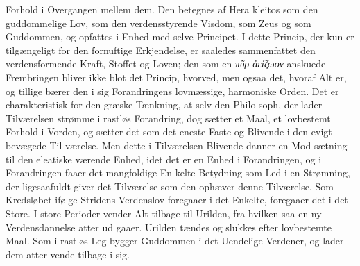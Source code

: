 \documentclass[12pt,a4paper]{book}
\newcommand{\gk}[1]{\textit{#1}}
\begin{document}
%
Forhold i Overgangen mellem dem. Den betegnes af Hera\-%
kleitos som den guddommelige Lov, som den verdensstyrende
Visdom, som Zeus og som Guddommen, og opfattes i Enhed
med selve Principet. I dette Princip, der kun er tilgængeligt
for den fornuftige Erkjendelse, er saaledes sammenfattet den
verdensformende Kraft, Stoffet og Loven; den som en \gk{πῦρ
ἀείζωον} anskuede Frembringen bliver ikke blot det Princip,
hvorved, men ogsaa det, hvoraf Alt er, og tillige bærer den i
sig Forandringens lovmæssige, harmoniske Orden. Det er
charakteristisk for den græske Tænkning, at selv den Philo\-%
soph, der lader Tilværelsen strømme i rastløs Forandring, dog
sætter et Maal, et lovbestemt Forhold i Vorden, og sætter det
som det eneste Faste og Blivende i den evigt bevægede Til\-%
værelse. Men dette i Tilværelsen Blivende danner en Mod\-%
sætning til den eleatiske værende Enhed, idet det er en Enhed
i Forandringen, og i Forandringen faaer det mangfoldige En\-%
kelte Betydning som Led i en Strømning, der ligesaafuldt
giver det Tilværelse som den ophæver denne Tilværelse. Som
Kredsløbet ifølge Stridens Verdenslov foregaaer i det Enkelte,
foregaaer det i det Store. I store Perioder vender Alt tilbage
til Urilden, fra hvilken saa en ny Verdensdannelse atter ud\-%
gaaer. Urilden tændes og slukkes efter lovbestemte Maal.
Som i rastløs Leg bygger Guddommen i det Uendelige Verdener,
og lader dem atter vende tilbage i sig.
\end{document}
